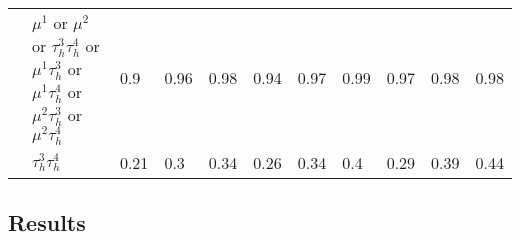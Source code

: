 \begin{table}
{\begin{tabular}{|c|c|c||lllllllll}
\multicolumn{1}{|l|}{} & \multicolumn{2}{l||}{$\mu^{1}$ or $\mu^{2}$ or $\tau_{h}^{3}\tau_{h}^{4}$ or $\mu^{1}\tau_{h}^{3}$ or $\mu^{1}\tau_{h}^{4}$ or $\mu^{2}\tau_{h}^{3}$ or $\mu^{2}\tau_{h}^{4}$} & \multicolumn{1}{l|}{0.9} & \multicolumn{1}{l|}{0.96} & \multicolumn{1}{l|}{0.98} & \multicolumn{1}{l|}{0.94} & \multicolumn{1}{l|}{0.97} & \multicolumn{1}{l|}{0.99} & \multicolumn{1}{l|}{0.97} & \multicolumn{1}{l|}{0.98} & \multicolumn{1}{l|}{0.98} \\
\multicolumn{1}{|l|}{} & \multicolumn{2}{l||}{$\tau_{h}^{3}\tau_{h}^{4}$} & \multicolumn{1}{l|}{0.21} & \multicolumn{1}{l|}{0.3} & \multicolumn{1}{l|}{0.34} & \multicolumn{1}{l|}{0.26} & \multicolumn{1}{l|}{0.34} & \multicolumn{1}{l|}{0.4} & \multicolumn{1}{l|}{0.29} & \multicolumn{1}{l|}{0.39} & \multicolumn{1}{l|}{0.44} \\
\hline
\end{tabular}
}
\end{table}


\subsection{Results}
